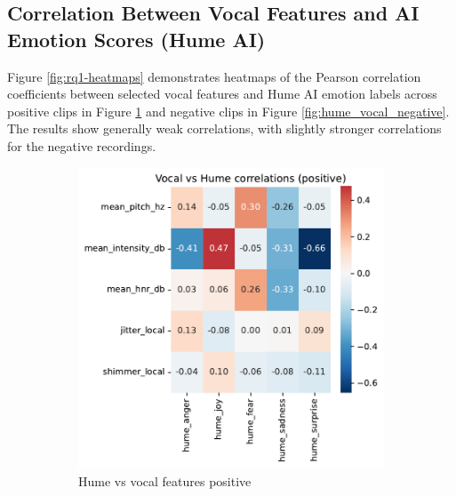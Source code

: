 \subsection{Correlation Between Vocal Features and AI Emotion Scores (Hume AI)}
Figure \ref{fig:rq1-heatmaps} demonstrates heatmaps of the Pearson correlation coefficients between selected vocal features and Hume AI emotion labels across positive clips in Figure \ref{fig:hume_vocal_positive} and negative clips in Figure \ref{fig:hume_vocal_negative}. The results show generally weak correlations, with slightly stronger correlations for the negative recordings.  

\begin{figure}[!h]
    \centering 
    \begin{subfigure}[b]{0.45\textwidth}
        \includegraphics[width=\textwidth]{png/results/rq1_new/vocal_vs_hume_correlations_positive.pdf}
        \caption{Hume vs vocal features positive}
        \label{fig:hume_vocal_positive}
    \end{subfigure}
    \begin{subfigure}[b]{0.45\textwidth}

\end{subfigure}
\end{figure}
